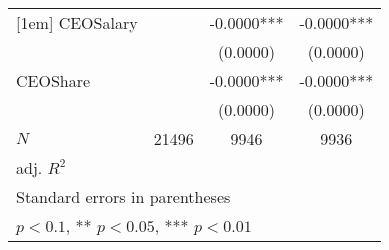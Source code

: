 \begin{table}[htbp]
\begin{tabular}{l*{3}{c}}
[1em]
CEOSalary   &               &     -0.0000***&     -0.0000***\\
            &               &    (0.0000)   &    (0.0000)   \\
[1em]
CEOShare    &               &     -0.0000***&     -0.0000***\\
            &               &    (0.0000)   &    (0.0000)   \\
\hline
\(N\)       &       21496   &        9946   &        9936   \\
adj. \(R^{2}\)&               &               &               \\
\hline\hline
\multicolumn{4}{l}{\footnotesize Standard errors in parentheses}\\
\multicolumn{4}{l}{\footnotesize * \(p<0.1\), ** \(p<0.05\), *** \(p<0.01\)}\\
\end{tabular}
\end{table}
